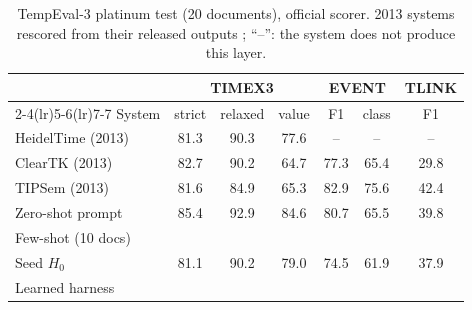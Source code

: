 \begin{table}[t]
\centering\footnotesize
\setlength{\tabcolsep}{1.9pt}
\begin{tabular}{@{}lcccccc@{}}
\toprule
& \multicolumn{3}{c}{TIMEX3} & \multicolumn{2}{c}{EVENT} & TLINK \\
\cmidrule(lr){2-4}\cmidrule(lr){5-6}\cmidrule(lr){7-7}
System & strict & relaxed & value & F1 & class & F1 \\
\midrule
HeidelTime (2013) & 81.3 & 90.3 & 77.6 & -- & -- & -- \\
ClearTK (2013) & 82.7 & 90.2 & 64.7 & 77.3 & 65.4 & 29.8 \\
TIPSem (2013) & 81.6 & 84.9 & 65.3 & 82.9 & 75.6 & 42.4 \\
\midrule
Zero-shot prompt & 85.4 & 92.9 & 84.6 & 80.7 & 65.5 & 39.8 \\
Few-shot (10 docs) & \gapcell{} & \gapcell{} & \gapcell{} & \gapcell{} & \gapcell{} & \gapcell{} \\
Seed $H_0$ & 81.1 & 90.2 & 79.0 & 74.5 & 61.9 & 37.9 \\
Learned harness & \gapcell{} & \gapcell{} & \gapcell{} & \gapcell{} & \gapcell{} & \gapcell{} \\
\bottomrule
\end{tabular}
\caption{TempEval-3 platinum test (20 documents), official scorer. 2013 systems rescored from their released outputs \citep{uzzaman2013semeval}; ``--'': the system does not produce this layer.}
\label{tab:timeml}
\end{table}
